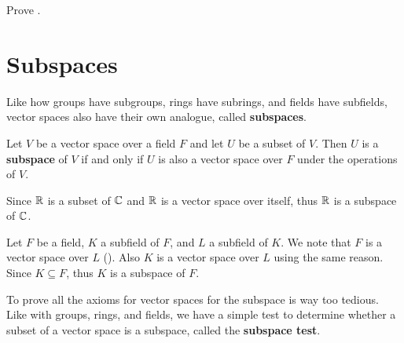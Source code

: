 \begin{exercise}\label{exercise-zero-vector-scaled-by-constant-is-zero-vector}
    Prove .
\end{exercise}

\section{Subspaces}
Like how groups have subgroups, rings have subrings, and fields have subfields, vector spaces also have their own analogue, called \textbf{subspaces}.
\begin{definition}
    Let $V$ be a vector space over a field $F$ and let $U$ be a subset of $V$. Then $U$ is a \textbf{subspace} of $V$ if and only if $U$ is also a vector space over $F$ under the operations of $V$.
\end{definition}

\begin{example}
    Since $\mathbb{R}$ is a subset of $\mathbb{C}$ and $\mathbb{R}$ is a vector space over itself, thus $\mathbb{R}$ is a subspace of $\mathbb{C}$.
\end{example}

\begin{example}
    Let $F$ be a field, $K$ a subfield of $F$, and $L$ a subfield of $K$. We note that $F$ is a vector space over $L$ (). Also $K$ is a vector space over $L$ using the same reason. Since $K \subseteq F$, thus $K$ is a subspace of $F$.
\end{example}

To prove all the axioms for vector spaces for the subspace is way too tedious. Like with groups, rings, and fields, we have a simple test to determine whether a subset of a vector space is a subspace, called the \textbf{subspace test}.

